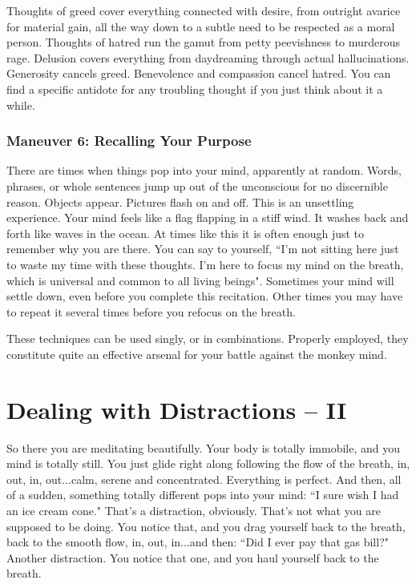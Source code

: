 Thoughts of greed cover everything connected with desire, from outright avarice
for material gain, all the way down to a subtle need to be respected as a moral
person. Thoughts of hatred run the gamut from petty peevishness to murderous
rage. Delusion covers everything from daydreaming through actual hallucinations.
Generosity cancels greed. Benevolence and compassion cancel hatred. You can find
a specific antidote for any troubling thought if you just think about it a
while.

\subsection*{Maneuver 6: Recalling Your Purpose}
There are times when things pop into your
mind, apparently at random. Words, phrases, or whole sentences jump up out of
the unconscious for no discernible reason. Objects appear. Pictures flash on and
off. This is an unsettling experience. Your mind feels like a flag flapping in a
stiff wind. It washes back and forth like waves in the ocean. At times like this
it is often enough just to remember why you are there. You can say to yourself,
``I'm not sitting here just to waste my time with these thoughts. I'm here to
focus my mind on the breath, which is universal and common to all living
beings". Sometimes your mind will settle down, even before you complete this
recitation. Other times you may have to repeat it several times before you
refocus on the breath.

These techniques can be used singly, or in combinations. Properly employed, they
constitute quite an effective arsenal for your battle against the monkey mind.

\chapter{Dealing with Distractions -- II}
 So there you are meditating
beautifully. Your body is totally immobile, and you mind is totally still. You
just glide right along following the flow of the breath, in, out, in,
out...calm, serene and concentrated. Everything is perfect. And then, all of a
sudden, something totally different pops into your mind: ``I sure wish I had an
ice cream cone." That's a distraction, obviously. That's not what you are
supposed to be doing. You notice that, and you drag yourself back to the breath,
back to the smooth flow, in, out, in...and then: ``Did I ever pay that gas bill?"
Another distraction. You notice that one, and you haul yourself back to the
breath.


